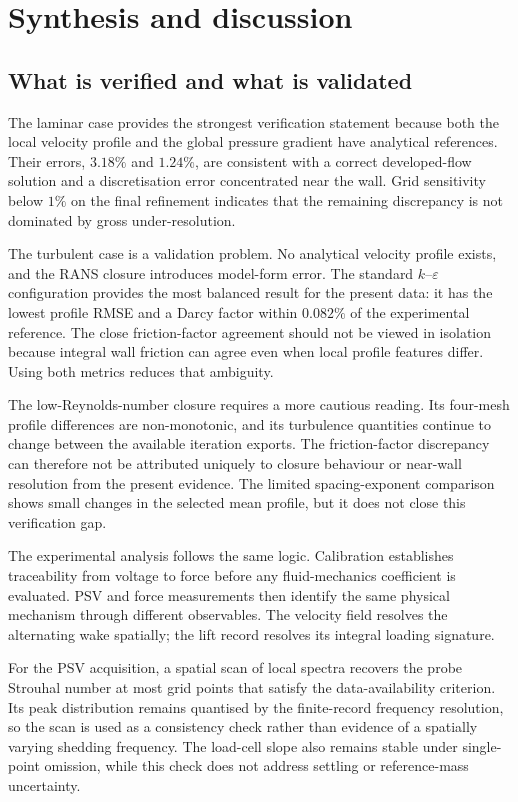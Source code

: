 \section{Synthesis and discussion}

\subsection{What is verified and what is validated}

The laminar case provides the strongest verification statement because both the local velocity profile and the global pressure gradient have analytical references. Their errors, $3.18\%$ and $1.24\%$, are consistent with a correct developed-flow solution and a discretisation error concentrated near the wall. Grid sensitivity below $1\%$ on the final refinement indicates that the remaining discrepancy is not dominated by gross under-resolution.

The turbulent case is a validation problem. No analytical velocity profile exists, and the RANS closure introduces model-form error. The standard $k$--$\varepsilon$ configuration provides the most balanced result for the present data: it has the lowest profile RMSE and a Darcy factor within $0.082\%$ of the experimental reference. The close friction-factor agreement should not be viewed in isolation because integral wall friction can agree even when local profile features differ. Using both metrics reduces that ambiguity.

The low-Reynolds-number closure requires a more cautious reading. Its four-mesh profile differences are non-monotonic, and its turbulence quantities continue to change between the available iteration exports. The friction-factor discrepancy can therefore not be attributed uniquely to closure behaviour or near-wall resolution from the present evidence. The limited spacing-exponent comparison shows small changes in the selected mean profile, but it does not close this verification gap.

The experimental analysis follows the same logic. Calibration establishes traceability from voltage to force before any fluid-mechanics coefficient is evaluated. PSV and force measurements then identify the same physical mechanism through different observables. The velocity field resolves the alternating wake spatially; the lift record resolves its integral loading signature.

For the PSV acquisition, a spatial scan of local spectra recovers the probe Strouhal number at most grid points that satisfy the data-availability criterion. Its peak distribution remains quantised by the finite-record frequency resolution, so the scan is used as a consistency check rather than evidence of a spatially varying shedding frequency. The load-cell slope also remains stable under single-point omission, while this check does not address settling or reference-mass uncertainty.

